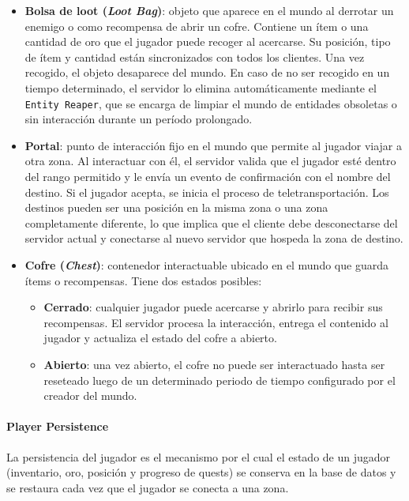 \begin{itemize}
    \item \textbf{Bolsa de loot (\textit{Loot Bag})}: objeto que aparece en el mundo al derrotar un enemigo o como recompensa 
    de abrir un cofre. Contiene un ítem o una cantidad de oro que el jugador puede recoger al acercarse. Su posición, tipo de ítem
    y cantidad están sincronizados con todos los clientes. Una vez recogido, el objeto desaparece del mundo. En caso de no ser
    recogido en un tiempo determinado, el servidor lo elimina automáticamente mediante el \texttt{Entity Reaper}, que se encarga de
    limpiar el mundo de entidades obsoletas o sin interacción durante un período prolongado.

    \item \textbf{Portal}: punto de interacción fijo en el mundo que permite al jugador viajar a otra zona.
    Al interactuar con él, el servidor valida que el jugador esté dentro del rango permitido y le envía un evento de
    confirmación con el nombre del destino. Si el jugador acepta, se inicia el proceso de teletransportación. Los destinos pueden
    ser una posición en la misma zona o una zona completamente diferente, lo que implica que el cliente debe desconectarse 
    del servidor actual y conectarse al nuevo servidor que hospeda la zona de destino.

    \item \textbf{Cofre (\textit{Chest})}: contenedor interactuable ubicado en el mundo que guarda ítems o recompensas.
    Tiene dos estados posibles:
    \begin{itemize}
        \item \textbf{Cerrado}: cualquier jugador puede acercarse y abrirlo para recibir sus recompensas.
            El servidor procesa la interacción, entrega el contenido al jugador y actualiza el estado del cofre a abierto.
        \item \textbf{Abierto}: una vez abierto, el cofre no puede ser interactuado hasta ser reseteado 
            luego de un determinado periodo de tiempo configurado por el creador del mundo.
    \end{itemize}
\end{itemize}

\paragraph{Player Persistence}
La persistencia del jugador es el mecanismo por el cual el estado de un jugador (inventario, oro, posición y progreso de quests) se conserva
en la base de datos y se restaura cada vez que el jugador se conecta a una zona.


